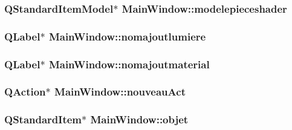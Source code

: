 \hypertarget{class_main_window_a6be7cafd28d97201c3df69a7b144f456}{
\subsubsection[{modelepieceshader}]{\setlength{\rightskip}{0pt plus 5cm}Q\+Standard\+Item\+Model$\ast$ Main\+Window\+::modelepieceshader\hspace{0.3cm}{\ttfamily [private]}}}\label{class_main_window_a6be7cafd28d97201c3df69a7b144f456}
\hypertarget{class_main_window_ad38c142eee23820d2d4c87217ea3558a}{
\subsubsection[{nomajoutlumiere}]{\setlength{\rightskip}{0pt plus 5cm}Q\+Label$\ast$ Main\+Window\+::nomajoutlumiere\hspace{0.3cm}{\ttfamily [private]}}}\label{class_main_window_ad38c142eee23820d2d4c87217ea3558a}
\hypertarget{class_main_window_ae0e05e579231d8e870d07ba9e4ae7223}{
\subsubsection[{nomajoutmaterial}]{\setlength{\rightskip}{0pt plus 5cm}Q\+Label$\ast$ Main\+Window\+::nomajoutmaterial\hspace{0.3cm}{\ttfamily [private]}}}\label{class_main_window_ae0e05e579231d8e870d07ba9e4ae7223}
\hypertarget{class_main_window_a193a37a0da1d22c48c64af3f6c5a6c51}{
\subsubsection[{nouveau\+Act}]{\setlength{\rightskip}{0pt plus 5cm}Q\+Action$\ast$ Main\+Window\+::nouveau\+Act\hspace{0.3cm}{\ttfamily [private]}}}\label{class_main_window_a193a37a0da1d22c48c64af3f6c5a6c51}
\hypertarget{class_main_window_ac76a7b94394a43600a0719ce4af388fc}{
\subsubsection[{objet}]{\setlength{\rightskip}{0pt plus 5cm}Q\+Standard\+Item$\ast$ Main\+Window\+::objet\hspace{0.3cm}{\ttfamily [private]}}}\label{class_main_window_ac76a7b94394a43600a0719ce4af388fc}
